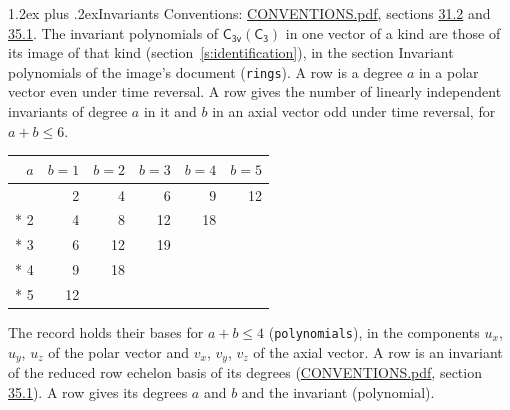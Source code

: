\documentclass[10pt,a4paper]{article}
\makeatletter
\renewcommand\section{\@startsection{section}{1}{\z@}{-3ex plus -1ex minus -.2ex}%
  {1.2ex plus .2ex}{\normalfont\large\sffamily\bfseries\color{parttitle}}}
\numberwithin{equation}{section}
\newcommand{\grp}[1]{\mathsf{#1}}
\makeatother
\begin{document}
\section{Invariants}\label{s:invariants}
Conventions: \href{../../CONVENTIONS.pdf}{CONVENTIONS.pdf}, sections \href{../../CONVENTIONS.pdf\#conv.31.2}{31.2} and \href{../../CONVENTIONS.pdf\#conv.35.1}{35.1}.
The invariant polynomials of $\grp{C_{3v}}(\grp{C_{3}})$ in one vector of a kind are those of its image of that kind (section~\ref{s:identification}), in the section Invariant polynomials of the image's document (\texttt{rings}).
\leavevmode\label{n:index.degree.polar}\label{n:index.degree.axial}A row is a degree $a$ in a polar vector even under time reversal. A row gives the number of linearly independent invariants of degree $a$ in it and $b$ in an axial vector odd under time reversal, for $a + b \le 6$.
{\small\begin{longtable}{@{}rrrrrr@{}}\toprule
$a$ & $b = 1$ & $b = 2$ & $b = 3$ & $b = 4$ & $b = 5$\\\midrule\endhead
\bottomrule\endfoot\endlastfoot
1 & 2 & 4 & 6 & 9 & 12\\*
2 & 4 & 8 & 12 & 18 & \\*
3 & 6 & 12 & 19 &  & \\*
4 & 9 & 18 &  &  & \\*
5 & 12 &  &  &  & \\
\bottomrule\end{longtable}}
\leavevmode\label{n:local.component.polar}\label{n:local.component.axial}The record holds their bases for $a + b \le 4$ (\texttt{polynomials}), in the components $u_{x}$, $u_{y}$, $u_{z}$ of the polar vector and $v_{x}$, $v_{y}$, $v_{z}$ of the axial vector. \label{n:head.polynomial}A row is an invariant of the reduced row echelon basis of its degrees (\href{../../CONVENTIONS.pdf}{CONVENTIONS.pdf}, section \href{../../CONVENTIONS.pdf\#conv.35.1}{35.1}). A row gives its degrees $a$ and $b$ and the invariant (polynomial).
\end{document}
